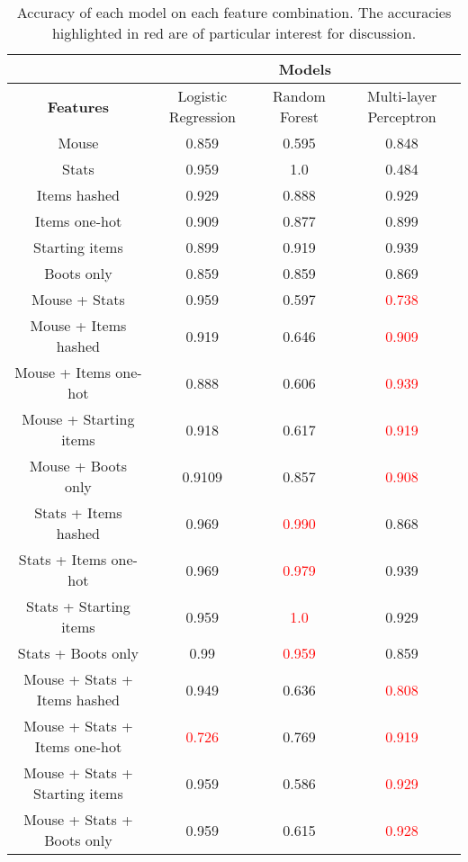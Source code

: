 \documentclass[Report.tex]{subfiles}
\begin{document}
\begin{table}[H]
\begin{tabular}{ c | c | c | c }
& \multicolumn{3}{c}{\textbf{Models}} \\ \hline
\textbf{Features} & Logistic Regression & Random Forest & Multi-layer Perceptron \\ \hline
Mouse & 0.859 & 0.595 & 0.848 \\ \hline
Stats & 0.959 & 1.0 & 0.484 \\ \hline
Items hashed & 0.929 & 0.888 & 0.929 \\ \hline
Items one-hot & 0.909 & 0.877 & 0.899 \\ \hline
Starting items & 0.899 & 0.919 & 0.939 \\ \hline
Boots only & 0.859 & 0.859 & 0.869 \\ \hline
Mouse + Stats & 0.959 & 0.597 & \textcolor{red}{0.738} \\ \hline
Mouse + Items hashed & 0.919 & 0.646 & \textcolor{red}{0.909} \\ \hline
Mouse + Items one-hot & 0.888 & 0.606 & \textcolor{red}{0.939} \\ \hline
Mouse + Starting items & 0.918 & 0.617 & \textcolor{red}{0.919} \\ \hline
Mouse + Boots only & 0.9109 & 0.857 & \textcolor{red}{0.908} \\ \hline
Stats + Items hashed & 0.969 & \textcolor{red}{0.990} & 0.868 \\ \hline
Stats + Items one-hot & 0.969 & \textcolor{red}{0.979} & 0.939 \\ \hline
Stats + Starting items & 0.959 & \textcolor{red}{1.0} & 0.929 \\ \hline
Stats + Boots only & 0.99 & \textcolor{red}{0.959} & 0.859 \\ \hline
Mouse + Stats + Items hashed & 0.949 & 0.636 & \textcolor{red}{0.808} \\ \hline
Mouse + Stats + Items one-hot & \textcolor{red}{0.726} & 0.769 & \textcolor{red}{0.919} \\ \hline
Mouse + Stats + Starting items & 0.959 & 0.586 & \textcolor{red}{0.929} \\ \hline
Mouse + Stats + Boots only & 0.959 & 0.615 & \textcolor{red}{0.928} \\
\end{tabular}
\caption{Accuracy of each model on each feature combination. The accuracies highlighted in red are of particular interest for discussion.}
\end{table}
\end{document}
